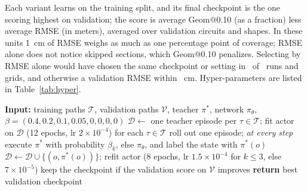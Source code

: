 \documentclass{IJCAS}
\begin{document}
Each variant learns on the training split, and its final checkpoint is the one scoring highest on validation; the score is average Geom@0.10 (as a fraction) less average RMSE (in meters), averaged over validation circuits and shapes. In these units 1~cm of RMSE weighs as much as one percentage point of coverage; RMSE alone does not notice skipped sections, which Geom@0.10 penalizes. Selecting by RMSE alone would have chosen the same checkpoint or setting in \VselSame\ of \VselTotal\ runs and grids, and otherwise a validation RMSE within \VselMaxDiff~cm. Hyper-parameters are listed in Table~\ref{tab:hyper}.

\begin{table}[t]
\caption{Learning hyper-parameters.}\label{tab:hyper}
\centering
{}
\end{table}

\begin{algorithm}[t]
\caption{DAgger for the bead (Bead-DAgger).}
\label{alg:dagger}
\begin{algorithmic}[1]
\STATE \textbf{Input:} training paths $\mathcal{T}$, validation paths $\mathcal{V}$, teacher $\pi^{*}$, network $\pi_\theta$, $\beta=(0.4,0.2,0.1,0.05,0,0,0,0)$
\STATE $\mathcal{D}\leftarrow$ one teacher episode per $\tau\in\mathcal{T}$; fit actor on $\mathcal{D}$ (12 epochs, lr $2\times10^{-4}$)
\STATE for each $\tau\in\mathcal{T}$ roll out one episode; \emph{at every step} execute $\pi^{*}$ with probability $\beta_k$, else $\pi_\theta$, and label the state with $\pi^{*}(o)$
\STATE $\mathcal{D}\leftarrow\mathcal{D}\cup\{(o,\pi^{*}(o))\}$; refit actor (8 epochs, lr $1.5\times10^{-4}$ for $k\le3$, else $7\times10^{-5}$)
\STATE keep the checkpoint if the validation score on $\mathcal{V}$ improves
\ENDFOR
\STATE \textbf{return} best validation checkpoint
\end{algorithmic}
\end{algorithm}
\end{document}
